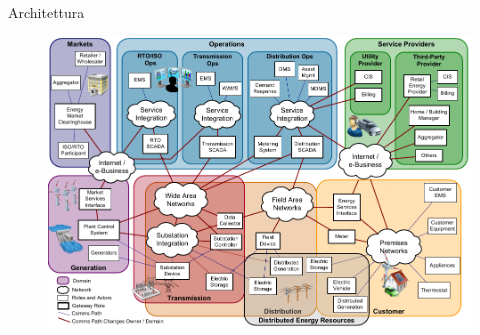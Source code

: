 
\begin{frame}[fragile]{Architettura}
	\vspace{-10pt}
	\begin{figure}[h] 
		\includegraphics[scale=0.45]{imgs/arch.png}
	\end{figure}
\end{frame}


